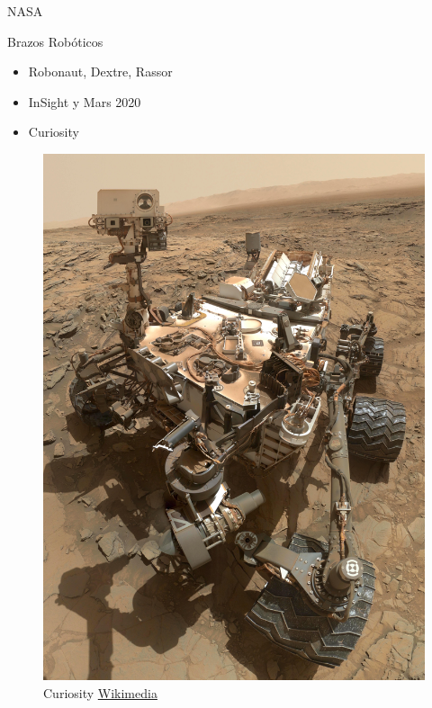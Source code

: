 \begin{frame}[fragile]{NASA}
\vspace{10px}
\pause
{}
\begin{block}{Brazos Robóticos}
	\begin{itemize}
		\item Robonaut, Dextre, Rassor
		\pause
		\item InSight y Mars 2020
		\pause
		\item Curiosity
	\end{itemize}
\end{block}
\begin{figure}
	\centering
	\pause
	\includegraphics[scale=0.019]{./EtapaModerna/Imagenes/curiosity.jpg}
	\caption{Curiosity \href{https://en.wikipedia.org/wiki/File:Curiosity_Self-Portrait_at_\%27Big_Sky\%27_Drilling_Site.jpg}{Wikimedia}}
\end{figure}
\end{frame}

